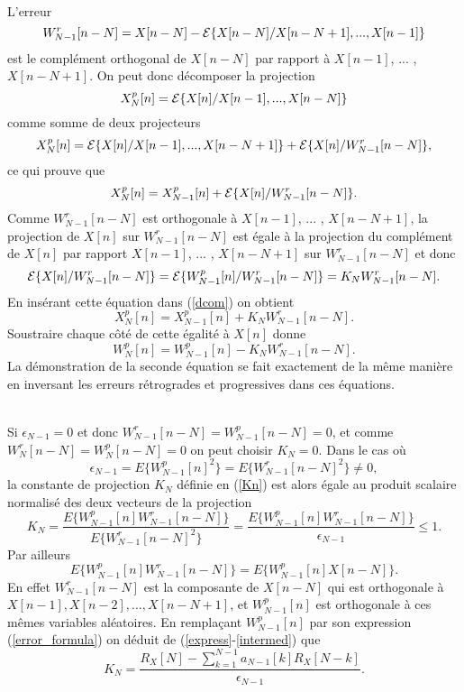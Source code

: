 \\
L'erreur 
\[
W^r_{N-1}[n-N] = X[n-N] - 
{\cal E} \{ X[n-N] {/} X[n-N+1] , ... , X[n-1] \} 
\]
est le compl\'ement orthogonal de $X[n-N]$ par rapport
\`a $X[n-1]$, ... , $X[n-N+1]$. 
On peut donc d\'ecomposer la projection
\[
X^p_N [n] ={\cal E} \{ X[n] {/} X[n-1] , ... , X[n-N] \} 
\]
comme somme de deux projecteurs
\[
X^p_N [n] 
={\cal E} \{ X[n] {/} X[n-1] , ... , X[n-N+1]\}
+ {\cal E}\{ X[n] {/} W^r_{N-1}[n-N] \} ,
\]
ce qui prouve que
\begin{equation}
\label{dcom}
X^p_N [n] 
= X^p_{N-1}[n] 
+ {\cal E}\{ X[n] {/} W^r_{N-1}[n-N] \} .
\end{equation}
Comme $W^r_{N-1}[n-N]$ est orthogonale \`a
$X[n-1]$, ... , $X[n-N+1]$, la projection de $X[n]$ sur
$W^r_{N-1}[n-N]$ est \'egale \`a la projection
du compl\'ement de $X[n]$ par rapport 
$X[n-1]$, ... , $X[n-N+1]$ sur 
$W^r_{N-1}[n-N]$ et donc
\begin{equation}
\label{Kn}
{\cal E}\{ X[n] {/} W^r_{N-1}[n-N] \} = 
{\cal E}\{ W^p_{N-1}[n] {/} W^r_{N-1}[n-N] \} 
= K_N W^r_{N-1}[n-N] .
\end{equation}
En ins\'erant cette \'equation dans (\ref{dcom}) on obtient 
\begin{equation}
X_N^p [n] = X_{N-1}^p [n] +
K_N W^r_{N-1} [n-N] .
\end{equation}
Soustraire chaque c\^ot\'e de cette \'egalit\'e \`a $X[n]$ donne
\[
W_N^p [n] = W_{N-1}^p [n] -  
K_N W^r_{N-1} [n-N] .
\]
La d\'emonstration de la seconde \'equation
se fait exactement de la m\^eme mani\`ere
en inversant les erreurs r\'etrogrades et progressives dans
ces \'equations.

\\
Si $\epsilon_{N-1} = 0$ et donc $W^r_{N-1}[n-N] = W^p_{N-1}[n-N] = 
0$, et comme
$W^r_{N}[n-N] = W^p_{N}[n-N] = 0$ 
on peut choisir $K_N = 0$.
Dans le cas o\`u
\[
\epsilon_{N-1} = E \{ W_{N-1}^p [n]^2 \} = 
E\{ W_{N-1}^r [n-N]^2 \} \neq 0 ,
\]
la constante de projection $K_N$ 
d\'efinie en (\ref{Kn}) est alors \'egale au 
produit scalaire normalis\'e des deux vecteurs de la projection
\begin{equation}
\label{express}
K_N = \frac  {E \{ W_{N-1}^p [n]W_{N-1}^r [n-N] \}}
{E\{ W_{N-1}^r [n-N]^2 \}} = 
\frac  {E \{ W_{N-1}^p [n]W_{N-1}^r [n-N] \}} 
{\epsilon_{N-1}} \leq 1 .
\end{equation}
Par ailleurs
\begin{equation}
\label{intermed}
{E \{ W_{N-1}^p [n]W_{N-1}^r [n-N] \}} = 
{E \{ W_{N-1}^p [n]X [n-N] \}} .
\end{equation}
En effet
$W^r_{N-1} [n-N]$ est la composante de $X[n-N]$
qui est orthogonale \`a $X[n-1], X[n-2], ... , X[n-N+1]$,
et $W_{N-1}^p [n]$ est orthogonale \`a ces m\^emes variables 
al\'eatoires.
En rempla\c{c}ant $W_{N-1}^p [n]$ par son expression
(\ref{error_formula}) on d\'eduit de (\ref{express}-\ref{intermed}) que
\[
K_N = \frac {R_X[N] - \sum_{k=1}^{N-1} a_{N-1} [k] R_X[N-k]} 
{\epsilon_{N-1}} .
\]

